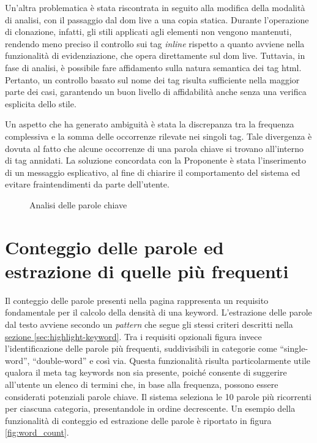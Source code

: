 \vspace{10pt}
\par\noindent Un’altra problematica è stata riscontrata in seguito alla modifica della modalità di analisi, con il passaggio dal \gls{dom} live a una copia statica. Durante l’operazione di clonazione, infatti, gli stili applicati agli elementi non vengono mantenuti, rendendo meno preciso il controllo sui tag \textit{inline} rispetto a quanto avviene nella funzionalità di evidenziazione, che opera direttamente sul \gls{dom} live. Tuttavia, in fase di analisi, è possibile fare affidamento sulla natura semantica dei tag \gls{html}. Pertanto, un controllo basato sul nome dei tag risulta sufficiente nella maggior parte dei casi, garantendo un buon livello di affidabilità anche senza una verifica esplicita dello stile.

\vspace{10pt}
\par\noindent Un aspetto che ha generato ambiguità è stata la discrepanza tra la frequenza complessiva e la somma delle occorrenze rilevate nei singoli tag. Tale divergenza è dovuta al fatto che alcune occorrenze di una parola chiave si trovano all’interno di tag annidati. La soluzione concordata con la Proponente è stata l’inserimento di un messaggio esplicativo, al fine di chiarire il comportamento del sistema ed evitare fraintendimenti da parte dell’utente.

\begin{figure}[H]
  \centering 
  \caption{Analisi delle parole chiave}
  \label{fig:analyze_keyword}
\end{figure}

\section{Conteggio delle parole ed estrazione di quelle più frequenti}
\label{sec:count-word}

\par Il conteggio delle parole presenti nella pagina rappresenta un requisito fondamentale per il calcolo della densità di una keyword. L'estrazione delle parole dal testo avviene secondo un \textit{pattern} che segue gli stessi criteri descritti nella \hyperref[sec:highlight-keyword]{sezione \textsection\ref*{sec:highlight-keyword}}. Tra i \gls{requisiti} opzionali figura invece l'identificazione delle parole più frequenti, suddivisibili in categorie come “single-word”, “double-word” e così via. Questa funzionalità risulta particolarmente utile qualora il meta tag keywords non sia presente, poiché consente di suggerire all’utente un elenco di termini che, in base alla frequenza, possono essere considerati potenziali parole chiave. Il sistema seleziona le 10 parole più ricorrenti per ciascuna categoria, presentandole in ordine decrescente. Un esempio della funzionalità di conteggio ed estrazione delle parole è riportato in figura \ref{fig:word_count}.

